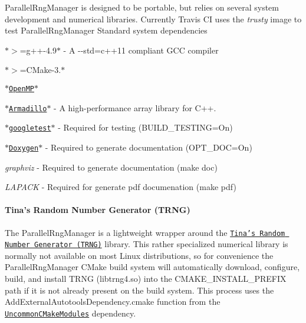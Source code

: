 Parallel\-Rng\-Manager is designed to be portable, but relies on several system development and numerical libraries. Currently Travis C\-I uses the {\itshape trusty} image to test Parallel\-Rng\-Manager Standard system dependencies
\begin{DoxyItemize}
\item $\ast$$>$=g++-\/4.9$\ast$ -\/ A {\ttfamily -\/-\/std=c++11} compliant G\-C\-C compiler
\item $\ast$$>$=C\-Make-\/3.$\ast$
\item \href{https://www.openmp.org/}{\tt $\ast$\-Open\-M\-P$\ast$}
\item \href{http://arma.sourceforge.net/docs.html}{\tt $\ast$\-Armadillo$\ast$} -\/ A high-\/performance array library for C++.
\item \href{https://github.com/google/googletest}{\tt $\ast$googletest$\ast$} -\/ Required for testing ({\ttfamily B\-U\-I\-L\-D\-\_\-\-T\-E\-S\-T\-I\-N\-G=On})
\item \href{https://github.com/google/googletest}{\tt $\ast$\-Doxygen$\ast$} -\/ Required to generate documentation ({\ttfamily O\-P\-T\-\_\-\-D\-O\-C=On})
\begin{DoxyItemize}
\item {\itshape graphviz} -\/ Required to generate documentation ({\ttfamily make doc})
\item {\itshape L\-A\-P\-A\-C\-K} -\/ Required for generate pdf documenation ({\ttfamily make pdf})
\end{DoxyItemize}
\end{DoxyItemize}

\paragraph*{Tina's Random Number Generator (T\-R\-N\-G)}

The Parallel\-Rng\-Manager is a lightweight wrapper around the \href{https://www.numbercrunch.de/trng/}{\tt Tina's Random Number Generator (T\-R\-N\-G)} library. This rather specialized numerical library is normally not available on most Linux distributions, so for convenience the Parallel\-Rng\-Manager C\-Make build system will automatically download, configure, build, and install T\-R\-N\-G ({\ttfamily libtrng4.\-so}) into the {\ttfamily C\-M\-A\-K\-E\-\_\-\-I\-N\-S\-T\-A\-L\-L\-\_\-\-P\-R\-E\-F\-I\-X} path if it is not already present on the build system. This process uses the {\ttfamily Add\-External\-Autotools\-Dependency.\-cmake} function from the \href{https://github.com/markjolah/UncommonCMakeModules}{\tt Uncommon\-C\-Make\-Modules} dependency.


